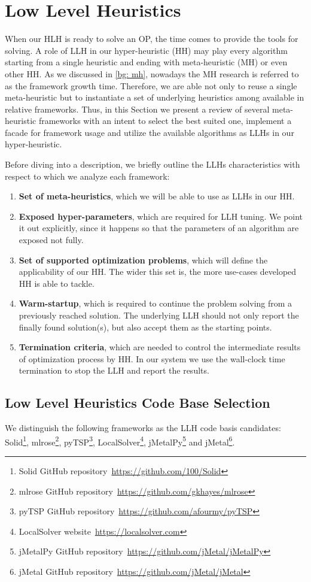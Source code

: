 \section{Low Level Heuristics}\label{impl: LLH}
When our HLH is ready to solve an OP, the time comes to provide the tools for solving. A role of LLH in our hyper-heuristic (HH) may play every algorithm starting from a single heuristic and ending with meta-heuristic (MH) or even other HH. As we discussed in \cref{bg: mh}, nowadays the MH research is referred to as the framework growth time. Therefore, we are able not only to reuse a single meta-heuristic but to instantiate a set of underlying heuristics among available in relative frameworks. Thus, in this Section we present a review of several meta-heuristic frameworks with an intent to select the best suited one, implement a facade for framework usage and utilize the available algorithms as LLHs in our hyper-heuristic.

Before diving into a description, we briefly outline the LLHs characteristics with respect to which we analyze each framework:
\begin{enumerate}
	\item \textbf{Set of meta-heuristics}, which we will be able to use as LLHs in our HH.
	
	\item \textbf{Exposed hyper-parameters}, which are required for LLH tuning. We point it out explicitly, since it happens so that the parameters of an algorithm are exposed not fully.
	
	\item \textbf{Set of supported optimization problems}, which will define the applicability of our HH. The wider this set is, the more use-cases developed HH is able to tackle.
	
	\item \textbf{Warm-startup}, which is required to continue the problem solving from a previously reached solution. The underlying LLH should not only report the finally found solution(s), but also accept them as the starting points.
	
	\item \textbf{Termination criteria}, which are needed to control the intermediate results of optimization process by HH. In our system we use the wall-clock time termination to stop the LLH and report the results.
\end{enumerate}


\subsection{Low Level Heuristics Code Base Selection}\label{implementation:llh code basis selection}
We distinguish the following frameworks as the LLH code basis candidates: Solid\footnote{Solid GitHub repository~\url{https://github.com/100/Solid}}, mlrose\footnote{mlrose GitHub repository~\url{https://github.com/gkhayes/mlrose}}, pyTSP\footnote{pyTSP GitHub repository~\url{https://github.com/afourmy/pyTSP}}, LocalSolver\footnote{LocalSolver website~\url{https://localsolver.com}}, jMetalPy\footnote{jMetalPy GitHub repository~\url{https://github.com/jMetal/jMetalPy}} and jMetal\footnote{jMetal GitHub repository~\url{https://github.com/jMetal/jMetal}}.

